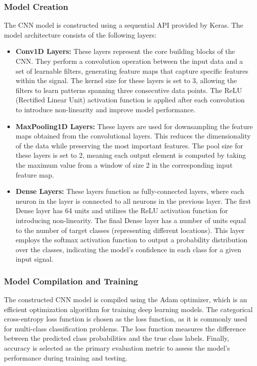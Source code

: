 \documentclass[
	article, %
	11pt, %
]{CSUniSchoolLabReport}
\begin{document}
\subsubsection{Model Creation}

The CNN model is constructed using a sequential API provided by Keras. The model architecture consists of the following layers:

\begin{itemize}
  \item \textbf{Conv1D Layers:} These layers represent the core building blocks of the CNN. They perform a convolution operation between the input data and a set of learnable filters, generating feature maps that capture specific features within the signal. The kernel size for these layers is set to 3, allowing the filters to learn patterns spanning three consecutive data points. The ReLU (Rectified Linear Unit) activation function is applied after each convolution to introduce non-linearity and improve model performance.

\item \textbf{MaxPooling1D Layers:} These layers are used for downsampling the feature maps obtained from the convolutional layers. This reduces the dimensionality of the data while preserving the most important features. The pool size for these layers is set to 2, meaning each output element is computed by taking the maximum value from a window of size 2 in the corresponding input feature map.

\item \textbf{Dense Layers:} These layers function as fully-connected layers, where each neuron in the layer is connected to all neurons in the previous layer. The first Dense layer has 64 units and utilizes the ReLU activation function for introducing non-linearity. The final Dense layer has a number of units equal to the number of target classes (representing different locations). This layer employs the softmax activation function to output a probability distribution over the classes, indicating the model's confidence in each class for a given input signal.
\end{itemize}

\subsubsection{Model Compilation and Training}

The constructed CNN model is compiled using the Adam optimizer, which is an efficient optimization algorithm for training deep learning models. The categorical cross-entropy loss function is chosen as the loss function, as it is commonly used for multi-class classification problems. The loss function measures the difference between the predicted class probabilities and the true class labels. Finally, accuracy is selected as the primary evaluation metric to assess the model's performance during training and testing.
\end{document}
